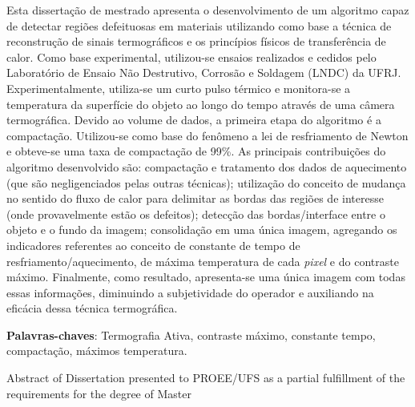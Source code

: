 \documentclass[
	    12pt,				%
	    openright,			%
	    oneside,			%
	    a4paper,			%
	english,			%
	french,				%
	spanish,			%
	brazil,				%
	]{abntex2}
\begin{document}
        Esta dissertação de mestrado apresenta o desenvolvimento de um algoritmo capaz de detectar regiões defeituosas em materiais utilizando como base a técnica de reconstrução de sinais termográficos e os princípios físicos de transferência de calor. Como base experimental, utilizou-se ensaios realizados e cedidos pelo Laboratório de Ensaio Não Destrutivo, Corrosão e Soldagem (LNDC) da UFRJ. Experimentalmente, utiliza-se um curto pulso térmico e monitora-se a temperatura da superfície do objeto ao longo do tempo através de uma câmera termográfica. Devido ao volume de dados, a primeira etapa do algoritmo é a compactação. Utilizou-se como base do fenômeno a lei de resfriamento de Newton e obteve-se uma taxa de compactação de 99\%.  As principais contribuições do algoritmo desenvolvido são: compactação e tratamento dos dados de aquecimento (que são negligenciados pelas outras técnicas); utilização do conceito de mudança no sentido do fluxo de calor para delimitar as bordas das regiões de interesse (onde provavelmente estão os defeitos); detecção das bordas/interface entre o objeto e o fundo da imagem; consolidação em uma única imagem, agregando os indicadores referentes ao conceito de constante de tempo de resfriamento/aquecimento, de máxima temperatura de cada \emph{pixel} e do contraste máximo. Finalmente, como resultado, apresenta-se uma única imagem com todas essas informações, diminuindo a subjetividade do operador e auxiliando na eficácia dessa técnica termográfica. 
    
    \par
    \noindent 
   \textbf{Palavras-chaves}: Termografia Ativa, contraste máximo, constante tempo, compactação, máximos temperatura.
    \newpage
    \newpage

    \noindent Abstract of Dissertation presented to PROEE/UFS as a partial fulfillment of the requirements for the degree of Master
\end{document}
